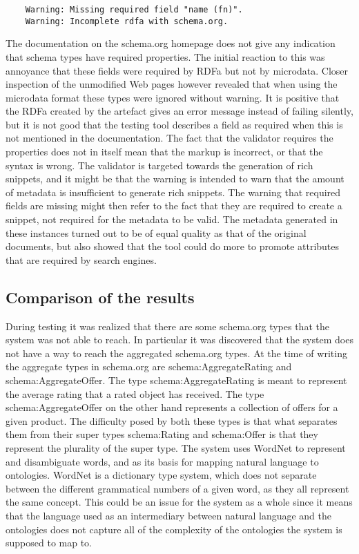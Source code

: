 \begin{verbatim}
	Warning: Missing required field "name (fn)".
	Warning: Incomplete rdfa with schema.org.
\end{verbatim}

The documentation on the schema.org homepage does not give any indication that schema types have required properties.
The initial reaction to this was annoyance that these fields were required by RDFa but not by microdata.
Closer inspection of the unmodified Web pages however revealed that when using the microdata format these types
were ignored without warning.
It is positive that the RDFa created by the artefact gives an error message instead of failing silently,
but it is not good that the testing tool describes a field as required when this is not mentioned in the documentation.
The fact that the validator requires the properties does not in itself mean that the markup is incorrect,
or that the syntax is wrong.
The validator is targeted towards the generation of rich snippets,
and it might be that the warning is intended to warn that the amount of metadata is insufficient to generate rich snippets.
The warning that required fields are missing might then refer to the fact that they are required to create a snippet,
not required for the metadata to be valid.
The metadata generated in these instances turned out to be of equal quality as that of the original documents,
but also showed that the tool could do more to promote attributes that are required by search engines.

\subsection{Comparison of the results}
During testing it was realized that there are some schema.org types that the system was not able to reach.
In particular it was discovered that the system does not have a way to reach the aggregated schema.org types.
At the time of writing the aggregate types in schema.org are schema:AggregateRating and schema:AggregateOffer.
The type schema:AggregateRating is meant to represent the average rating that a rated object has received.
The type schema:AggregateOffer on the other hand represents a collection of offers for a given product.
The difficulty posed by both these types is that what separates them from their super types schema:Rating and schema:Offer
is that they represent the plurality of the super type.
The system uses WordNet to represent and disambiguate words, and as its basis for mapping natural language to ontologies.
WordNet is a dictionary type system, which does not separate between the different grammatical numbers of a given word,
as they all represent the same concept.
This could be an issue for the system as a whole since it means that the language used as an intermediary between natural language
and the ontologies does not capture all of the complexity of the ontologies the system is supposed to map to.

